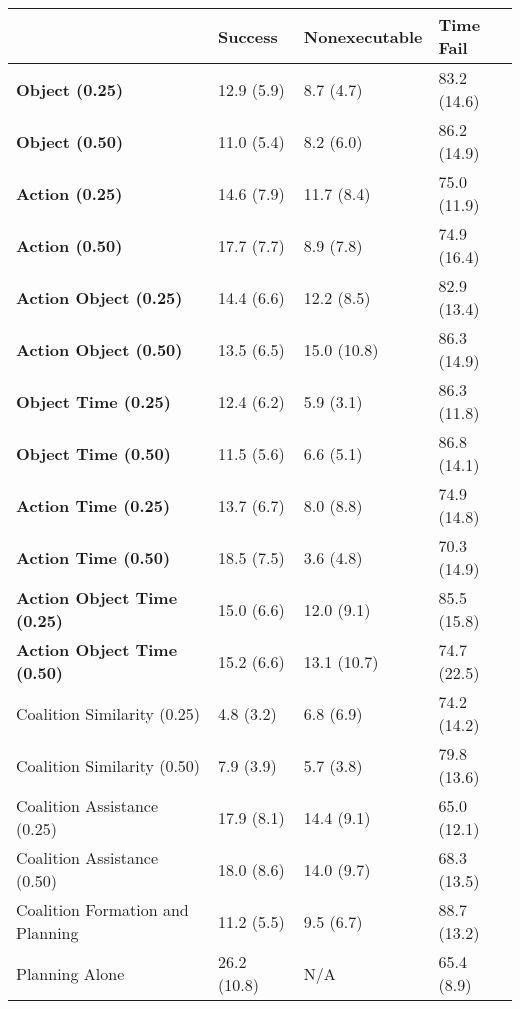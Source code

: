 \begin{tabular}{llll}
\hline
                                    & Success     & Nonexecutable   & Time Fail   \\
\hline
 \textbf{Object (0.25)}             & 12.9 (5.9)  & 8.7 (4.7)       & 83.2 (14.6) \\
 \textbf{Object (0.50)}             & 11.0 (5.4)  & 8.2 (6.0)       & 86.2 (14.9) \\
 \textbf{Action (0.25)}             & 14.6 (7.9)  & 11.7 (8.4)      & 75.0 (11.9) \\
 \textbf{Action (0.50)}             & 17.7 (7.7)  & 8.9 (7.8)       & 74.9 (16.4) \\
 \textbf{Action Object (0.25)}      & 14.4 (6.6)  & 12.2 (8.5)      & 82.9 (13.4) \\
 \textbf{Action Object (0.50)}      & 13.5 (6.5)  & 15.0 (10.8)     & 86.3 (14.9) \\
 \textbf{Object Time (0.25)}        & 12.4 (6.2)  & 5.9 (3.1)       & 86.3 (11.8) \\
 \textbf{Object Time (0.50)}        & 11.5 (5.6)  & 6.6 (5.1)       & 86.8 (14.1) \\
 \textbf{Action Time (0.25)}        & 13.7 (6.7)  & 8.0 (8.8)       & 74.9 (14.8) \\
 \textbf{Action Time (0.50)}        & 18.5 (7.5)  & 3.6 (4.8)       & 70.3 (14.9) \\
 \textbf{Action Object Time (0.25)} & 15.0 (6.6)  & 12.0 (9.1)      & 85.5 (15.8) \\
 \textbf{Action Object Time (0.50)} & 15.2 (6.6)  & 13.1 (10.7)     & 74.7 (22.5) \\
 Coalition Similarity (0.25)        & 4.8 (3.2)   & 6.8 (6.9)       & 74.2 (14.2) \\
 Coalition Similarity (0.50)        & 7.9 (3.9)   & 5.7 (3.8)       & 79.8 (13.6) \\
 Coalition Assistance (0.25)        & 17.9 (8.1)  & 14.4 (9.1)      & 65.0 (12.1) \\
 Coalition Assistance (0.50)        & 18.0 (8.6)  & 14.0 (9.7)      & 68.3 (13.5) \\
 Coalition Formation and Planning   & 11.2 (5.5)  & 9.5 (6.7)       & 88.7 (13.2) \\
 Planning Alone                     & 26.2 (10.8) & N/A             & 65.4 (8.9)  \\
\hline
\end{tabular}